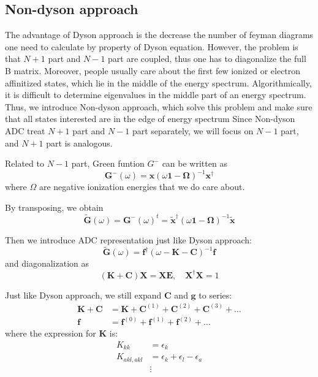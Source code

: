 \subsection{Non-dyson approach}
The advantage of Dyson approach is the decrease the number of feyman diagrams one need to calculate by property of Dyson equation.
However, the problem is that $N+1$ part and $N-1$ part are coupled, thus one has to diagonalize the full B matrix.
Moreover, people usually care about the first few ionized or electron affinitized states, which lie in the middle of the energy spectrum.
Algorithmically, it is difficult to determine eigenvalues in the middle part of an energy spectrum.
Thus, we introduce Non-dyson approach, which solve this problem and make sure that all states interested are in the edge of energy spectrum
Since Non-dyson ADC treat $N+1$ part and $N-1$ part separately, we will focus on $N-1$ part, and $N+1$ part is analogous.

Related to $N-1$ part, Green funtion $G^{-}$ can be written as
\begin{equation}
	\boldsymbol{G}^{-}(\omega)=\boldsymbol{x}(\omega \mathbf{1}-\boldsymbol{\Omega})^{-1} \boldsymbol{x}^{\dagger}
\end{equation}
where $\Omega$ are negative ionization energies that we do care about.

By transposing, we obtain
\begin{equation}
	\tilde{\boldsymbol{G}}(\omega)=\boldsymbol{G}^{-}(\omega)^{t}=\tilde{\boldsymbol{x}}^{\dagger}(\omega \mathbf{1}-\boldsymbol{\Omega})^{-1} \tilde{\boldsymbol{x}}
\end{equation}

Then we introduce ADC representation just like Dyson approach:
\begin{equation}
	\tilde{\boldsymbol{G}}(\omega)=\boldsymbol{f}^{\dagger}(\omega-\boldsymbol{K}-\boldsymbol{C})^{-1} \boldsymbol{f}
\end{equation}
and diagonalization as
\begin{equation} \label{KCeigen}
	(\boldsymbol{K}+\boldsymbol{C}) \boldsymbol{X}=\boldsymbol{X} \boldsymbol{E}, \quad \boldsymbol{X}^{\dagger} \boldsymbol{X}=1
\end{equation}

Just like Dyson approach, we still expand $\boldsymbol{C}$ and $\boldsymbol{g}$ to series:
\begin{equation}
	\begin{aligned} \boldsymbol{K}+\boldsymbol{C} &=\boldsymbol{K}+\boldsymbol{C}^{(1)}+\boldsymbol{C}^{(2)}+\boldsymbol{C}^{(3)}+\ldots \\ \boldsymbol{f} &=\boldsymbol{f}^{(0)}+\boldsymbol{f}^{(1)}+\boldsymbol{f}^{(2)}+\ldots \end{aligned}
\end{equation}
where the expression for $\boldsymbol{K}$ is:
\begin{equation}
	\begin{aligned} K_{k k} &=\epsilon_{k} \\ K_{a k l, a k l} &=\epsilon_{k}+\epsilon_{l}-\epsilon_{a} \\ & \vdots \end{aligned}
\end{equation}

